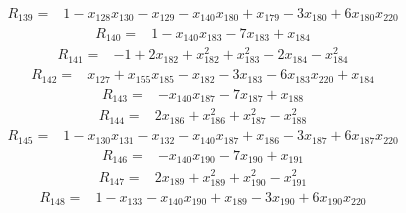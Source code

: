 \begin{equation*}\begin{split}
R_{139}={}&1 - x_{128} x_{130} - x_{129} - x_{140} x_{180} + x_{179} - 3x_{180} + 6x_{180} x_{220}
\end{split}\end{equation*}
\begin{equation*}\begin{split}
R_{140}={}&1 - x_{140} x_{183} - 7x_{183} + x_{184}
\end{split}\end{equation*}
\begin{equation*}\begin{split}
R_{141}={}&-1 + 2x_{182} + x_{182}^{2} + x_{183}^{2} - 2x_{184} - x_{184}^{2}
\end{split}\end{equation*}
\begin{equation*}\begin{split}
R_{142}={}&x_{127} + x_{155} x_{185} - x_{182} - 3x_{183} - 6x_{183} x_{220} + x_{184}
\end{split}\end{equation*}
\begin{equation*}\begin{split}
R_{143}={}&-x_{140} x_{187} - 7x_{187} + x_{188}
\end{split}\end{equation*}
\begin{equation*}\begin{split}
R_{144}={}&2x_{186} + x_{186}^{2} + x_{187}^{2} - x_{188}^{2}
\end{split}\end{equation*}
\begin{equation*}\begin{split}
R_{145}={}&1 - x_{130} x_{131} - x_{132} - x_{140} x_{187} + x_{186} - 3x_{187} + 6x_{187} x_{220}
\end{split}\end{equation*}
\begin{equation*}\begin{split}
R_{146}={}&-x_{140} x_{190} - 7x_{190} + x_{191}
\end{split}\end{equation*}
\begin{equation*}\begin{split}
R_{147}={}&2x_{189} + x_{189}^{2} + x_{190}^{2} - x_{191}^{2}
\end{split}\end{equation*}
\begin{equation*}\begin{split}
R_{148}={}&1 - x_{133} - x_{140} x_{190} + x_{189} - 3x_{190} + 6x_{190} x_{220}
\end{split}\end{equation*}
